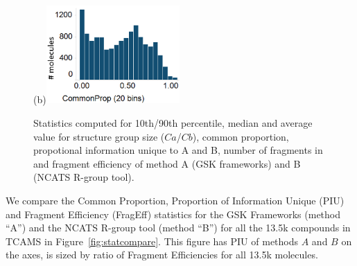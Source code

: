 \documentclass[journal=jacsat,manuscript=article]{achemso}
\newcommand*\fref[1]{Figure~\ref{fig:#1}}
\begin{document}
\begin{figure}
  \begin{minipage}[c]{\linewidth}
\vspace{0pt}
\centering
{}
(b)\includegraphics[width=2in]{fig/CP_TCAMS_GSKFW_RGT.png}
  \end{minipage}
  \caption{Statistics computed for 10th/90th percentile, median and average value for structure group size ($Ca$/$Cb$), common proportion, propotional information unique to A and B, number of fragments in and fragment efficiency of method A (GSK frameworks) and B (NCATS R-group tool).}
\label{fig:statcomparetable}
\end{figure}


We compare the Common Proportion, Proportion of Information Unique (PIU) and Fragment Efficiency (FragEff) statistics for the GSK Frameworks (method ``A'') and the NCATS R-group tool (method ``B'') for all the 13.5k compounds in TCAMS in \fref{statcompare}.  This figure has PIU of methods $A$ and $B$ on the axes, is sized by ratio of Fragment Efficiencies for all 13.5k molecules.   
\end{document}
